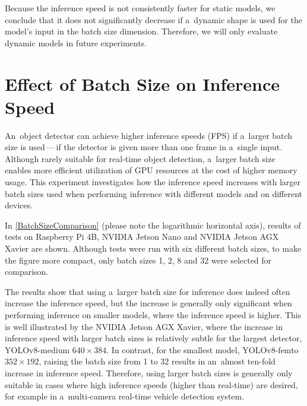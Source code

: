Because the inference speed is not consistently faster for static models, we
conclude that it does not significantly decrease if a~dynamic shape is used for
the model's input in the batch size dimension. Therefore, we will only evaluate
dynamic models in future experiments.








\section{Effect of Batch Size on Inference Speed}
\label{BatchSizeComparisonSection}

An~object detector can achieve higher inference speeds (FPS) if a~larger batch
size is used\,---\,if the detector is given more than one frame in a~single
input. Although rarely suitable for real-time object detection, a~larger batch
size enables more efficient utilization of GPU resources at the cost of higher
memory usage. This experiment investigates how the inference speed increases
with larger batch sizes used when performing inference with different models and
on different devices.

In \autoref{BatchSizeComparison} (please note the logarithmic horizontal axis),
results of tests on Raspberry Pi 4B, NVIDIA Jetson Nano and NVIDIA Jetson AGX
Xavier are shown. Although tests were run with six different batch sizes, to
make the figure more compact, only batch sizes 1, 2, 8 and 32 were selected for
comparison.

The results show that using a~larger batch size for inference does indeed often
increase the inference speed, but the increase is generally only significant
when performing inference on smaller models, where the inference speed is
higher. This is well illustrated by the NVIDIA Jetson AGX Xavier, where the
increase in inference speed with larger batch sizes is relatively subtle for the
largest detector, YOLOv8-medium $640 \times 384$. In contrast, for the smallest
model, YOLOv8-femto $352 \times 192$, raising the batch size from 1 to 32
results in an~almost ten-fold increase in inference speed. Therefore, using
larger batch sizes is generally only suitable in cases where high inference
speeds (higher than real-time) are desired, for example in a~multi-camera
real-time vehicle detection system.


